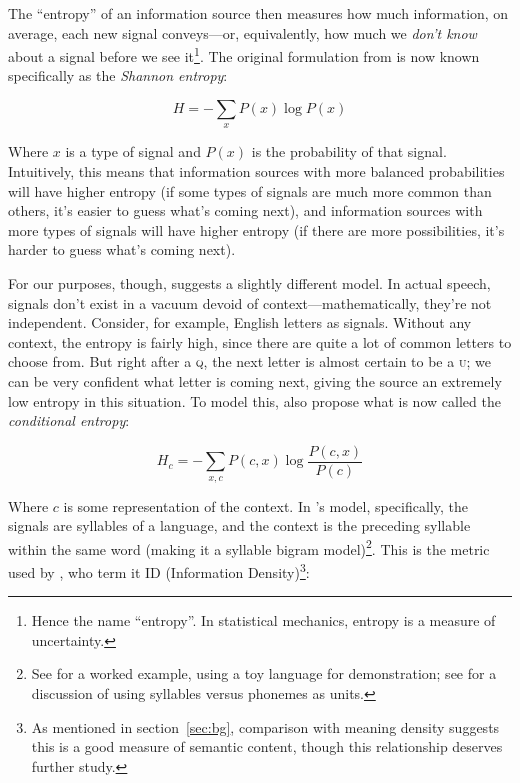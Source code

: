 \documentclass[12pt,twoside]{article}
\begin{document}
The ``entropy'' of an information source then measures how much information, on average, each new signal conveys---or, equivalently, how much we \emph{don't know} about a signal before we see it\footnote{Hence the name ``entropy''. In statistical mechanics, entropy is a measure of uncertainty.}. The original formulation from \citet[50]{shannon} is now known specifically as the \emph{Shannon entropy}:

\begin{equation}
\label{eqn:shannon}
H = - \sum_x P(x) \log P(x)
\end{equation}

Where \(x\) is a type of signal and \(P(x)\) is the probability of that signal. Intuitively, this means that information sources with more balanced probabilities will have higher entropy (if some types of signals are much more common than others, it's easier to guess what's coming next), and information sources with more types of signals will have higher entropy (if there are more possibilities, it's harder to guess what's coming next).

For our purposes, though, \citet{oh} suggests a slightly different model. In actual speech, signals don't exist in a vacuum devoid of context---mathematically, they're not independent. Consider, for example, English letters as signals. Without any context, the entropy is fairly high, since there are quite a lot of common letters to choose from. But right after a \textsc{q}, the next letter is almost certain to be a \textsc{u}; we can be very confident what letter is coming next, giving the source an extremely low entropy in this situation. To model this, \citet[52]{shannon} also propose what is now called the \emph{conditional entropy}:

\begin{equation}
H_c = - \sum_{x,c} P(c,x) \log \frac{P(c,x)}{P(c)}
\end{equation}

Where \(c\) is some representation of the context. In \citeauthor{oh}'s model, specifically, the signals are syllables of a language, and the context is the preceding syllable within the same word (making it a syllable bigram model)\footnote{See \cite[41]{oh} for a worked example, using a toy language for demonstration; see \cite[545]{pellegrino} for a discussion of using syllables versus phonemes as units.}. This is the metric used by \citet{coupé}, who term it ID (Information Density)\footnote{As mentioned in section~\ref{sec:bg}, comparison with  meaning density suggests this is a good measure of semantic content, though this relationship deserves further study.}:
\end{document}
